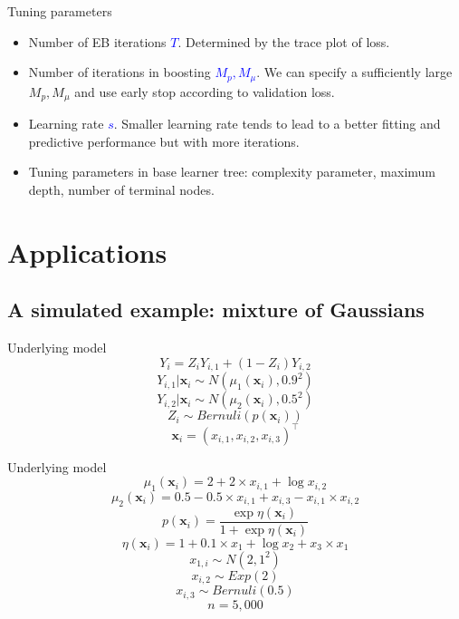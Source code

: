 \documentclass[professionalfont]{beamer}
\def\bx{\boldsymbol{x}}
\newcommand{\blue}[1]{\textcolor{blue}{#1}}
\begin{document}
\begin{frame}{Tuning parameters}
	\begin{itemize}
		\item Number of EB iterations \blue{$T$}. Determined by the trace plot of loss.
		\item Number of iterations in boosting \blue{$M_p,M_\mu$}. We can specify a sufficiently large $M_p,M_\mu$ and use  early stop according to validation loss.
			\item Learning rate \blue{$s$}. Smaller learning rate tends to lead to a better fitting and predictive performance but with more iterations.
			\item Tuning parameters in base learner tree: complexity parameter, maximum depth, number of terminal nodes.
	\end{itemize}
\end{frame}

\section{Applications}
\subsection{A simulated example: mixture of Gaussians}
\begin{frame}{Underlying model}
$$Y_i =Z_iY_{i,1}+(1-Z_i)Y_{i,2}$$
$$Y_{i,1}|\bx_i \sim N(\mu_1(\bx_i), 0.9^2)$$
$$Y_{i,2}|\bx_i \sim N(\mu_2(\bx_i), 0.5^2)$$
$$Z_i \sim Bernuli(p(\bx_i))$$
$$\bx_i=(x_{i,1},x_{i,2},x_{i,3})^{\top}$$
\end{frame}

\begin{frame}{Underlying model}
	$$\mu_1(\bx_i)=2+2\times x_{i,1} + \log x_{i,2}$$
	$$\mu_2(\bx_i) = 0.5-0.5\times x_{i,1}+x_{i,3}-x_{i,1}\times x_{i,2}$$
	$$p(\bx_i)=\frac{\exp\eta(\bx_i)}{1+\exp\eta(\bx_i)}$$
	$$\eta(\bx_i)=1+0.1\times x_1+\log x_2 +x_3\times x_1$$
	$$x_{1,i}\sim N(2,1^2)$$
	$$x_{i,2}\sim Exp(2)$$
	$$x_{i,3}\sim Bernuli(0.5)$$
	$$n=5,000$$
\end{frame}
\end{document}

